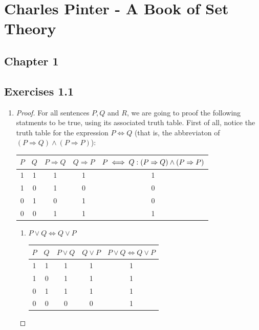 \documentclass{article}
\begin{document}
	
	\section*{Charles Pinter - A Book of Set Theory}
	\subsection*{Chapter 1}
	\par\bigskip
	\subsection*{Exercises 1.1}
	\begin{enumerate}
		\item \begin{proof}
			For all sentences $P,Q$ and $R$, we are going to proof the following statments to be true, using its associated truth table. First of all, notice the truth table for the expression $P \iff Q $ (that is, the abbreviaton of $(P \Rightarrow Q) \land (P \Rightarrow P)$): 
			
			\begin{center}
				\begin{tabular}{|c|c|c|c|c|}
					\hline
					$P$ & $Q$ & $P \Rightarrow Q$ & $Q \Rightarrow P$ & $P \iff Q: \tiny (P \Rightarrow Q) \land (P \Rightarrow P)$ \\
					\hline
					1 & 1 & 1 & 1 & 1\\
					1 & 0 & 1 & 0 & 0\\
					0 & 1 & 0 & 1 & 0\\
					0 & 0 & 1 & 1 & 1\\
					\hline
				\end{tabular}
			\end{center} 
			
			{
				\begin{enumerate}
					\item[i.] $P \lor Q \iff Q \lor P$
					
					\begin{center}
						\begin{tabular}{|c|c|c|c|c|}
							\hline
							$P$ & $Q$ & $P \lor Q$ & $Q \lor P$ & $P \lor Q \iff Q \lor P $ \\
							\hline
							1 & 1 & 1 & 1 & 1\\
							1 & 0 & 1 & 1 & 1\\
							0 & 1 & 1 & 1 & 1\\
							0 & 0 & 0 & 0 & 1\\
							\hline
						\end{tabular}
					\end{center}
					

\end{enumerate}}
\end{proof}
\end{enumerate}
\end{document}
